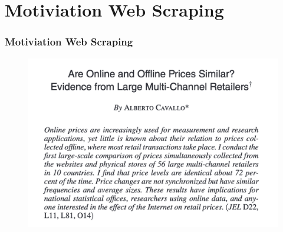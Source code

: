 

\section{Motiviation Web Scraping}
\begin{frame}
\frametitle{Motiviation Web Scraping}



\begin{figure}[H] \centering
  \centering
  \includegraphics[scale=0.45]{figures/Cavallo_title}
  \\
  \tiny
\end{figure}
 

\end{frame}

